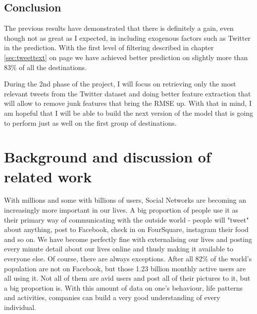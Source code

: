 \documentclass[minf,frontabs,twoside,singlespacing,parskip]{infthesis}
\begin{document}
%

\section{Conclusion}

The previous results have demonstrated that there is definitely a gain, even though not as great as I expected, in including exogenous factors such as Twitter in the prediction. With the first level of filtering described in chapter \ref{sec:tweettext} on page \pageref{sec:tweettext} we have achieved better prediction on slightly more than 83\% of all the destinations.  


During the 2nd phase of the project, I will focus on retrieving only the most relevant tweets from the Twitter dataset and doing better feature extraction that will allow to remove junk features that bring the RMSE up. With that in mind, I am hopeful that I will be able to build the next version of the model that is going to perform just as well on the first group of destinations. 



\chapter{Background and discussion of related work}


With millions and some with billions of users, Social Networks are becoming an increasingly more important in our lives. A big proportion of people use it as their primary way of communicating with the outside world - people will "tweet" about anything, post to Facebook, check in on FourSquare, instagram their food and so on. We have become perfectly fine with externalising our lives and posting every minute detail about our lives online and thusly making it available to everyone else. 
Of course, there are always exceptions. After all 82\% of the world's population are not on Facebook, but those 1.23 billion monthly active users are all using it. Not all of them are avid users and post all of their pictures to it, but a big proportion is. With this amount of data on one's behaviour, life patterns and activities, companies can build a very good understanding of every individual. 
\end{document}
